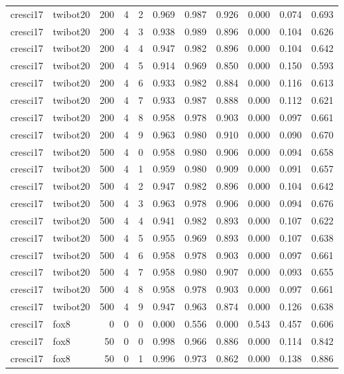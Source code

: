 \begin{tabular}{llrrrrrrrrr}
cresci17 & twibot20 & 200 & 4 & 2 & 0.969 & 0.987 & 0.926 & 0.000 & 0.074 & 0.693 \\
cresci17 & twibot20 & 200 & 4 & 3 & 0.938 & 0.989 & 0.896 & 0.000 & 0.104 & 0.626 \\
cresci17 & twibot20 & 200 & 4 & 4 & 0.947 & 0.982 & 0.896 & 0.000 & 0.104 & 0.642 \\
cresci17 & twibot20 & 200 & 4 & 5 & 0.914 & 0.969 & 0.850 & 0.000 & 0.150 & 0.593 \\
cresci17 & twibot20 & 200 & 4 & 6 & 0.933 & 0.982 & 0.884 & 0.000 & 0.116 & 0.613 \\
cresci17 & twibot20 & 200 & 4 & 7 & 0.933 & 0.987 & 0.888 & 0.000 & 0.112 & 0.621 \\
cresci17 & twibot20 & 200 & 4 & 8 & 0.958 & 0.978 & 0.903 & 0.000 & 0.097 & 0.661 \\
cresci17 & twibot20 & 200 & 4 & 9 & 0.963 & 0.980 & 0.910 & 0.000 & 0.090 & 0.670 \\
cresci17 & twibot20 & 500 & 4 & 0 & 0.958 & 0.980 & 0.906 & 0.000 & 0.094 & 0.658 \\
cresci17 & twibot20 & 500 & 4 & 1 & 0.959 & 0.980 & 0.909 & 0.000 & 0.091 & 0.657 \\
cresci17 & twibot20 & 500 & 4 & 2 & 0.947 & 0.982 & 0.896 & 0.000 & 0.104 & 0.642 \\
cresci17 & twibot20 & 500 & 4 & 3 & 0.963 & 0.978 & 0.906 & 0.000 & 0.094 & 0.676 \\
cresci17 & twibot20 & 500 & 4 & 4 & 0.941 & 0.982 & 0.893 & 0.000 & 0.107 & 0.622 \\
cresci17 & twibot20 & 500 & 4 & 5 & 0.955 & 0.969 & 0.893 & 0.000 & 0.107 & 0.638 \\
cresci17 & twibot20 & 500 & 4 & 6 & 0.958 & 0.978 & 0.903 & 0.000 & 0.097 & 0.661 \\
cresci17 & twibot20 & 500 & 4 & 7 & 0.958 & 0.980 & 0.907 & 0.000 & 0.093 & 0.655 \\
cresci17 & twibot20 & 500 & 4 & 8 & 0.958 & 0.978 & 0.903 & 0.000 & 0.097 & 0.661 \\
cresci17 & twibot20 & 500 & 4 & 9 & 0.947 & 0.963 & 0.874 & 0.000 & 0.126 & 0.638 \\
cresci17 & fox8 & 0 & 0 & 0 & 0.000 & 0.556 & 0.000 & 0.543 & 0.457 & 0.606 \\
cresci17 & fox8 & 50 & 0 & 0 & 0.998 & 0.966 & 0.886 & 0.000 & 0.114 & 0.842 \\
cresci17 & fox8 & 50 & 0 & 1 & 0.996 & 0.973 & 0.862 & 0.000 & 0.138 & 0.886 \\

\end{tabular}
